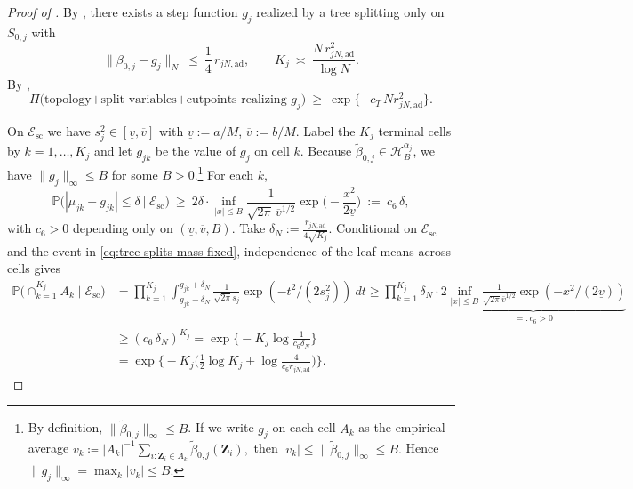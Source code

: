 \documentclass[11pt]{article}
\theoremstyle{plain}
\theoremstyle{definition}
\theoremstyle{plain}
\begin{document}
\begin{proof}[Proof of ]
By , there exists a step function $g_j$ realized by a tree splitting only on $S_{0,j}$ with
\begin{equation}\label{eq:approx-error-fixed}
\|\beta_{0,j}-g_j\|_N \ \le\ \frac{1}{4}\,r_{jN,\mathrm{ad}},
\qquad
K_j\ \asymp\ \frac{N\,r_{jN,\mathrm{ad}}^2}{\log N}.
\end{equation}
By ,
\begin{equation}\label{eq:tree-splits-mass-fixed}
\Pi\bigl(\text{topology+split-variables+cutpoints realizing }g_j\bigr)
\ \ge\ \exp\{-c_T\,N r_{jN,\mathrm{ad}}^2\}.
\end{equation}

On $\mathcal E_{\mathrm{sc}}$ we have $s_j^2\in[\underline v,\overline v]$ with $\underline v:=a/M$, $\overline v:=b/M$. Label the $K_j$ terminal cells by $k=1,\dots,K_j$ and let $g_{jk}$ be the value of $g_j$ on cell $k$. Because $\tilde\beta_{0,j}\in\mathcal H_B^{\alpha_j}$, we have $\|g_j\|_\infty\le B$ for some $B>0$.\footnote{By definition, $\|\tilde{\beta}_{0,j}\|_{\infty} \le B$. If we write $g_j$ on each cell $A_k$ as the empirical average  $v_k \coloneqq |A_k|^{-1} \sum_{i:\bm{Z}_i \in A_k} \tilde{\beta}_{0,j}(\bm{Z}_i),$ then $|v_k| \le \|\tilde{\beta}_{0,j}\|_{\infty} \le B.$ Hence $\|g_j\|_{\infty} = \max_{k} |v_k| \le B.$} For each $k$,
\[
\mathbb P\big(|\mu_{jk}-g_{jk}|\le \delta\ \big|\ \mathcal E_{\mathrm{sc}}\big)
\ \ge\ 2\delta\cdot \inf_{|x|\le B}\frac{1}{\sqrt{2\pi}\,\overline v^{1/2}}\exp\!\Big(-\frac{x^2}{2\underline v}\Big)
\ :=\ c_6\,\delta,
\]
with $c_6>0$ depending only on $(\underline v,\overline v,B)$.
Take \(
\delta_N :=\frac{r_{jN,\mathrm{ad}}}{4\sqrt{K_j}}.
\) Conditional on $\mathcal E_{\mathrm{sc}}$ and the event in \eqref{eq:tree-splits-mass-fixed}, independence of the leaf means across cells gives
\begin{align}
\mathbb P\Big(\cap_{k=1}^{K_j} A_k \mid \mathcal E_{\mathrm{sc}}\Big) & = \prod_{k=1}^{K_j}\int_{g_{jk}-\delta_{N}}^{g_{jk}+\delta_N} \frac{1}{\sqrt{2\pi} s_j}\exp(-t^2/(2s_j ^2)) \ dt \ge \prod_{k=1}^{K_j} \delta_N \cdot \underbrace{2\inf_{|x| \le B}\frac{1}{\sqrt{2\pi} \bar{v}^{1/2}}\exp(-x^2/(2\underline{v}))}_{=:c_6 >0} \nonumber\\
&\ge (c_6\,\delta_N)^{K_j}
= \exp\!\Big\{ -K_j \log\!\frac{1}{c_6\delta_N}\Big\}\nonumber\\
&= \exp\!\Big\{ -K_j\Big(\tfrac{1}{2}\log K_j + \log\!\tfrac{4}{c_6 r_{jN,\mathrm{ad}}}\Big)\Big\}.\label{eq:leaf-close-fixed}

\end{align}
\end{proof}
\end{document}
